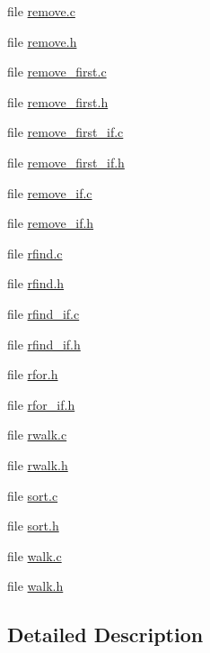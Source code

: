 \begin{DoxyCompactItemize}
\item 
file \hyperlink{remove_8c}{remove.\-c}
\item 
file \hyperlink{remove_8h}{remove.\-h}
\item 
file \hyperlink{remove__first_8c}{remove\-\_\-first.\-c}
\item 
file \hyperlink{remove__first_8h}{remove\-\_\-first.\-h}
\item 
file \hyperlink{remove__first__if_8c}{remove\-\_\-first\-\_\-if.\-c}
\item 
file \hyperlink{remove__first__if_8h}{remove\-\_\-first\-\_\-if.\-h}
\item 
file \hyperlink{remove__if_8c}{remove\-\_\-if.\-c}
\item 
file \hyperlink{remove__if_8h}{remove\-\_\-if.\-h}
\item 
file \hyperlink{rfind_8c}{rfind.\-c}
\item 
file \hyperlink{rfind_8h}{rfind.\-h}
\item 
file \hyperlink{rfind__if_8c}{rfind\-\_\-if.\-c}
\item 
file \hyperlink{rfind__if_8h}{rfind\-\_\-if.\-h}
\item 
file \hyperlink{rfor_8h}{rfor.\-h}
\item 
file \hyperlink{rfor__if_8h}{rfor\-\_\-if.\-h}
\item 
file \hyperlink{rwalk_8c}{rwalk.\-c}
\item 
file \hyperlink{rwalk_8h}{rwalk.\-h}
\item 
file \hyperlink{sort_8c}{sort.\-c}
\item 
file \hyperlink{sort_8h}{sort.\-h}
\item 
file \hyperlink{walk_8c}{walk.\-c}
\item 
file \hyperlink{walk_8h}{walk.\-h}
\end{DoxyCompactItemize}


\subsection{Detailed Description}
